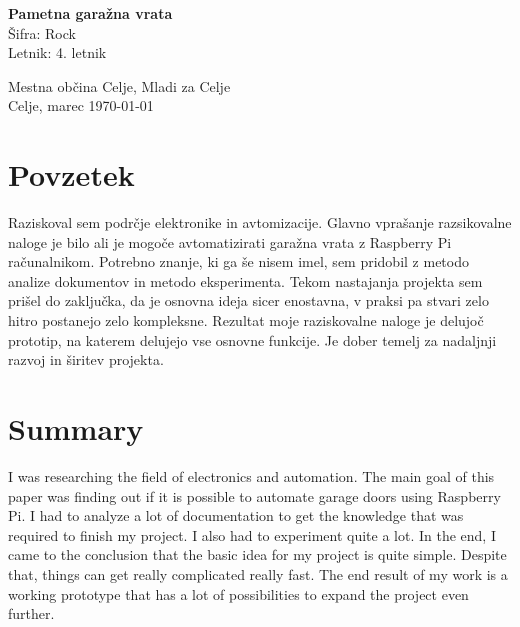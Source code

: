 \documentclass[11pt]{article}
\begin{document}
\renewcommand{\theFancyVerbLine}{
  \sffamily\textcolor[rgb]{0.5,0.5,0.5}{\scriptsize\arabic{FancyVerbLine}}}
\begin{titlepage}
\thispagestyle{empty}
   \center
   \fancyhead{}
   \vspace*{\fill}
   \begin{center}
   \Huge{\bfseries Pametna garažna vrata}\\
   \vspace{1mm}
   \large{Šifra: Rock}\\
   \large{Letnik: 4. letnik}
   \end{center}
   \vspace*{\fill}
   \begin{minipage}{0.5\textwidth}
     \begin{center}
         \vspace{5mm}
         Mestna občina Celje, Mladi za Celje\\
       \large{Celje, marec \monthyeardate\today}
     \end{center}
   \end{minipage}
   \fancyfoot{}
  \end{titlepage}

\newpage
\thispagestyle{empty}
\section*{Povzetek}
Raziskoval sem podrčje elektronike in avtomizacije. Glavno vprašanje razsikovalne naloge je bilo ali je mogoče avtomatizirati garažna vrata z Raspberry Pi računalnikom. Potrebno znanje, ki ga še nisem imel, sem pridobil z metodo analize dokumentov in metodo eksperimenta. Tekom nastajanja projekta sem prišel do zaključka, da je osnovna ideja sicer enostavna, v praksi pa stvari zelo hitro postanejo zelo kompleksne. Rezultat moje raziskovalne naloge je delujoč prototip, na katerem delujejo vse osnovne funkcije. Je dober temelj za nadaljnji razvoj in širitev projekta.
\section*{Summary}
I was researching the field of electronics and automation. The main goal of this paper was finding out if it is possible to automate garage doors using Raspberry Pi. I had to analyze a lot of documentation to get the knowledge that was required to finish my project. I also had to experiment quite a lot. In the end, I came to the conclusion that the basic idea for my project is quite simple. Despite that, things can get really complicated really fast. The end result of my work is a working prototype that has a lot of possibilities to expand the project even further.
\end{document}
